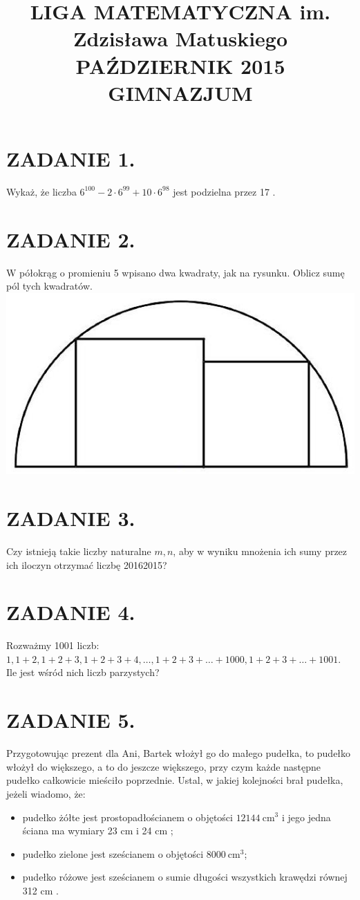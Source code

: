 \documentclass[10pt]{article}
\title{LIGA MATEMATYCZNA im. Zdzisława Matuskiego \\
 PAŹDZIERNIK 2015 \\
 GIMNAZJUM }
\author{}
\date{}
\begin{document}
\maketitle
\section*{ZADANIE 1.}
Wykaż, że liczba \(6^{100}-2 \cdot 6^{99}+10 \cdot 6^{98}\) jest podzielna przez 17 .

\section*{ZADANIE 2.}
W półokrąg o promieniu 5 wpisano dwa kwadraty, jak na rysunku. Oblicz sumę pól tych kwadratów.\\
\includegraphics[max width=\textwidth, center]{2024_11_21_6cb928c4a60329347530g-1}

\section*{ZADANIE 3.}
Czy istnieją takie liczby naturalne \(m, n\), aby w wyniku mnożenia ich sumy przez ich iloczyn otrzymać liczbę 20162015?

\section*{ZADANIE 4.}
Rozważmy 1001 liczb: \(1,1+2,1+2+3,1+2+3+4, \ldots, 1+2+3+\ldots+1000,1+2+3+\ldots+1001\). Ile jest wśród nich liczb parzystych?

\section*{ZADANIE 5.}
Przygotowując prezent dla Ani, Bartek włożył go do małego pudełka, to pudełko włożył do większego, a to do jeszcze większego, przy czym każde następne pudełko całkowicie mieściło poprzednie. Ustal, w jakiej kolejności brał pudełka, jeżeli wiadomo, że:

\begin{itemize}
  \item pudełko żółte jest prostopadłościanem o objętości \(12144 \mathrm{~cm}^{3}\) i jego jedna ściana ma wymiary 23 cm i 24 cm ;
  \item pudełko zielone jest sześcianem o objętości \(8000 \mathrm{~cm}^{3}\);
  \item pudełko różowe jest sześcianem o sumie długości wszystkich krawędzi równej 312 cm .
\end{itemize}
\end{document}
